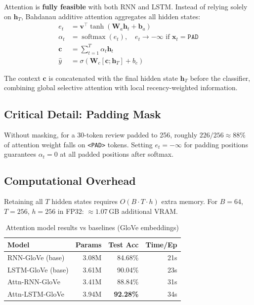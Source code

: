 \documentclass[10pt,a4paper,twocolumn]{article}
\begin{document}
Attention is \textbf{fully feasible} with both RNN and LSTM. Instead of
relying solely on $\mathbf{h}_T$, Bahdanau additive attention
aggregates all hidden states:
\begin{align}
  e_t &= \mathbf{v}^\top\tanh(\mathbf{W}_a\mathbf{h}_t+\mathbf{b}_a) \label{eq:energy}\\
  \alpha_t &= \operatorname{softmax}(e_t),\quad e_t\!\to\!{-\infty}\text{ if }\mathbf{x}_t\!=\!\texttt{PAD}\\
  \mathbf{c} &= \textstyle\sum_{t=1}^{T}\alpha_t\mathbf{h}_t\\
  \hat{y} &= \sigma\!\left(\mathbf{W}_c[\mathbf{c};\mathbf{h}_T]+b_c\right)
\end{align}

The context $\mathbf{c}$ is concatenated with the final hidden state $\mathbf{h}_T$
before the classifier, combining global selective attention with local
recency-weighted information.

\subsection{Critical Detail: Padding Mask}

Without masking, for a 30-token review padded to 256, roughly
$226/256\approx88\%$ of attention weight falls on \texttt{<PAD>} tokens.
Setting $e_t\!=\!{-\infty}$ for padding positions guarantees $\alpha_t\!=\!0$
at all padded positions after softmax.

\subsection{Computational Overhead}

Retaining all $T$ hidden states requires $O(B\cdot T\cdot h)$ extra memory.
For $B=64$, $T=256$, $h=256$ in FP32: ${\approx}1.07$\,GB additional VRAM.

\begin{table}[H]
\centering\small
\caption{Attention model results vs baselines (GloVe embeddings)}
\begin{tabular}{lrrr}
\toprule
Model & Params & Test Acc & Time/Ep\\
\midrule
RNN-GloVe (base)   & 3.08M & 84.68\% & 21s\\
LSTM-GloVe (base)  & 3.61M & 90.04\% & 23s\\
\midrule
Attn-RNN-GloVe     & 3.41M & 88.84\% & 31s\\
Attn-LSTM-GloVe    & 3.94M & \textbf{92.28\%} & 34s\\
\bottomrule
\end{tabular}
\label{tab:attn_results}
\end{table}
\end{document}
